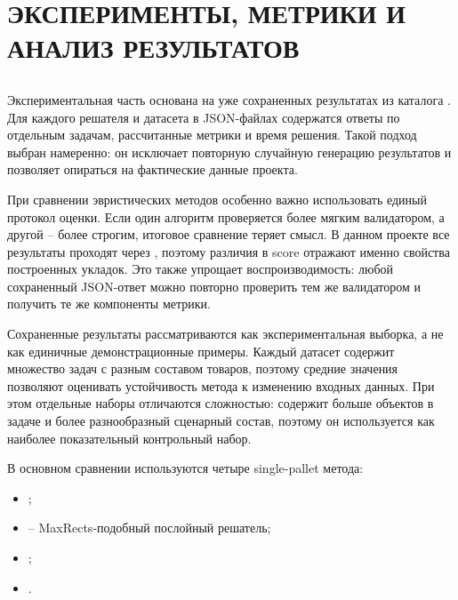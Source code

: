 \clearpage
\section[\MakeUppercase{Эксперименты, метрики и анализ результатов}]{\centering\MakeUppercase{Эксперименты, метрики и анализ результатов}}

\subsection{}

Экспериментальная часть основана на уже сохраненных результатах из каталога . Для каждого решателя и датасета в JSON-файлах содержатся ответы по отдельным задачам, рассчитанные метрики и время решения. Такой подход выбран намеренно: он исключает повторную случайную генерацию результатов и позволяет опираться на фактические данные проекта.

При сравнении эвристических методов особенно важно использовать единый протокол оценки. Если один алгоритм проверяется более мягким валидатором, а другой -- более строгим, итоговое сравнение теряет смысл. В данном проекте все результаты проходят через , поэтому различия в score отражают именно свойства построенных укладок. Это также упрощает воспроизводимость: любой сохраненный JSON-ответ можно повторно проверить тем же валидатором и получить те же компоненты метрики.

Сохраненные результаты рассматриваются как экспериментальная выборка, а не как единичные демонстрационные примеры. Каждый датасет содержит множество задач с разным составом товаров, поэтому средние значения позволяют оценивать устойчивость метода к изменению входных данных. При этом отдельные наборы отличаются сложностью:  содержит больше объектов в задаче и более разнообразный сценарный состав, поэтому он используется как наиболее показательный контрольный набор.

В основном сравнении используются четыре single-pallet метода:
\begin{itemize}
  \item {};
  \item {} -- MaxRects-подобный послойный решатель;
  \item {};
  \item {}.
\end{itemize}

